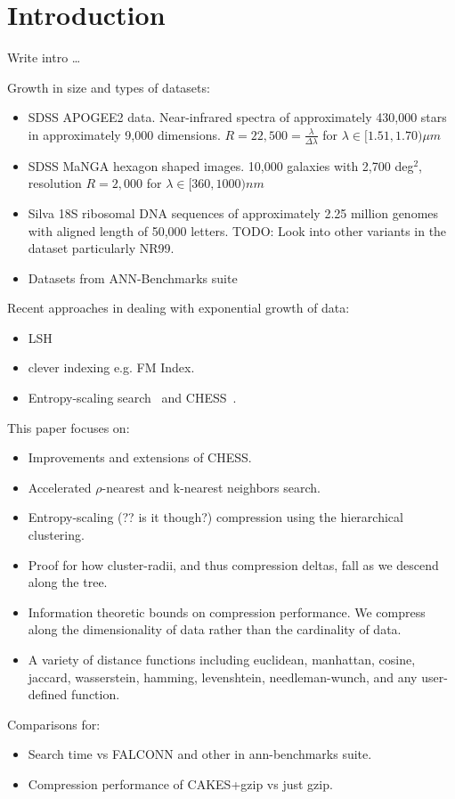 \section{Introduction}
\label{sec:introduction}

Write intro \dots

Growth in size and types of datasets:
\begin{itemize}
    \item SDSS APOGEE2 data. Near-infrared spectra of approximately 430,000 stars in approximately 9,000 dimensions. $R=22,500 = \frac{\lambda}{\Delta \lambda}$ for $\lambda \in [1.51, 1.70) \mu m$
    \item SDSS MaNGA hexagon shaped images. 10,000 galaxies with 2,700 deg$^2$, resolution $R=2,000$ for $\lambda \in [360, 1000) nm$
    \item Silva 18S ribosomal DNA sequences of approximately 2.25 million genomes with aligned length of 50,000 letters. TODO: Look into other variants in the dataset particularly NR99.
    \item Datasets from ANN-Benchmarks suite
\end{itemize}

Recent approaches in dealing with exponential growth of data:
\begin{itemize}
    \item LSH
    \item clever indexing e.g. FM Index.
    \item Entropy-scaling search~\cite{yu2015entropy} and CHESS~\cite{ishaq2019clustered}.
\end{itemize}

This paper focuses on:
\begin{itemize}
    \item Improvements and extensions of CHESS.
    \item Accelerated $\rho$-nearest and k-nearest neighbors search.
    \item Entropy-scaling (?? is it though?) compression using the hierarchical clustering.
    \item Proof for how cluster-radii, and thus compression deltas, fall as we descend along the tree.
    \item Information theoretic bounds on compression performance. We compress along the dimensionality of data rather than the cardinality of data.
    \item A variety of distance functions including euclidean, manhattan, cosine, jaccard, wasserstein, hamming, levenshtein, needleman-wunch, and any user-defined function.
\end{itemize}

Comparisons for:
\begin{itemize}
    \item Search time vs FALCONN and other in ann-benchmarks suite.
    \item Compression performance of CAKES+gzip vs just gzip.
\end{itemize}
